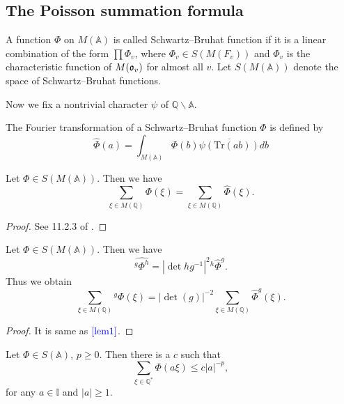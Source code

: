 \subsection{The Poisson summation formula}

\begin{definition}
A function $\Phi$ on $M(\mathbb A)$ is called Schwartz--Bruhat function if it is a linear combination of the form
$\prod \Phi_v$, where $\Phi_v\in S(M(F_v))$ and $\Phi_v$ is the characteristic function of $M(\mathfrak o_v)$ for almost all $v$. Let $S(M(\mathbb A))$ denote the space of Schwartz--Bruhat functions.
\end{definition}

Now we fix a nontrivial character $\psi$ of $\mathbb Q \backslash \mathbb A$.

\begin{definition}
The Fourier transformation of a Schwartz--Bruhat function $\Phi$ is defined by 
\[
\widehat \Phi(a)=\int_{M(\mathbb A)}\Phi(b)\overline{\psi(\mathrm {Tr}(ab))} db 
\]
\end{definition}

\begin{theorem}
Let $\Phi\in S(M(\mathbb A))$. Then we have
\[
\sum\limits_{\xi\in M(\mathbb Q)} \Phi(\xi)=\sum\limits_{\xi\in M(\mathbb Q)} \widehat\Phi(\xi).
\]
\end{theorem}

\begin{proof}
See 11.2.3 of \cite{G-H}.
\end{proof}

\begin{corollary}
Let $\Phi\in S(M(\mathbb A))$. Then we have
\[
\widehat {^g\Phi^h}=\left | \det hg^{-1} \right |^2 {^h{\widehat \Phi}^g}.
\]
Thus we obtain
\begin{equation}\label{eq3}
\sum\limits_{\xi\in M(\mathbb Q)} {^g\Phi}(\xi)=\left | \det (g) \right |^{-2}\sum\limits_{\xi\in M(\mathbb Q)} {\widehat \Phi}^g(\xi).
\end{equation}
\end{corollary}

\begin{proof}
It is same as $\textcolor{blue}{\ref{lem1}}$.
\end{proof}

\begin{lemma}\label{lem3.2.1}
Let $\Phi\in S(\mathbb A)$, $p\ge 0$. Then there is a $c$ such that 
\begin{equation}
\sum\limits_ {\xi \in \mathbb Q^*} \Phi (a\xi )\le c\left |a\right |^{-p},  
\end{equation}
for any $a\in \mathbb I$ and $\left |a\right | \ge 1$. 
\end{lemma}


